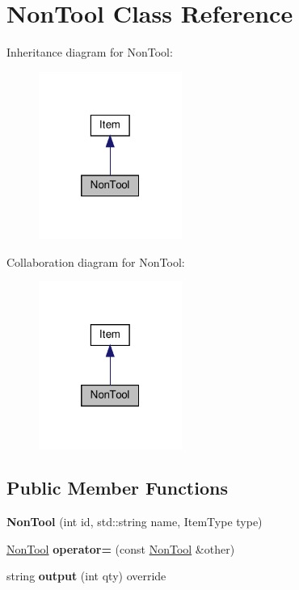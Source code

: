 \hypertarget{classNonTool}{}\section{Non\+Tool Class Reference}
\label{classNonTool}


Inheritance diagram for Non\+Tool\+:
\nopagebreak
\begin{figure}[H]
\begin{center}
\leavevmode
\includegraphics[width=133pt]{classNonTool__inherit__graph}
\end{center}
\end{figure}


Collaboration diagram for Non\+Tool\+:
\nopagebreak
\begin{figure}[H]
\begin{center}
\leavevmode
\includegraphics[width=133pt]{classNonTool__coll__graph}
\end{center}
\end{figure}
\subsection*{Public Member Functions}
\begin{DoxyCompactItemize}
\item 
\mbox{\label{classNonTool_a401a2fdd6bb0a5f08fe1bb624d24cac4}} 
{\bfseries Non\+Tool} (int id, std\+::string name, Item\+Type type)
\item 
\mbox{\label{classNonTool_a041faeae0c0bdb98ba41079a1773b6f2}} 
\hyperlink{classNonTool}{Non\+Tool} {\bfseries operator=} (const \hyperlink{classNonTool}{Non\+Tool} \&other)
\item 
\mbox{\label{classNonTool_ac4dcee4d5d2f0e8c03aa80103baacc3f}} 
string {\bfseries output} (int qty) override
\end{DoxyCompactItemize}
